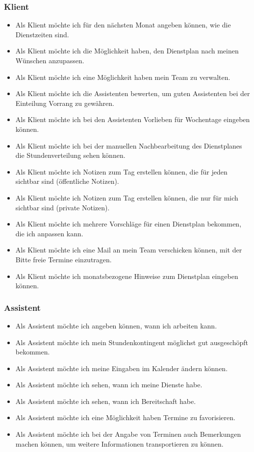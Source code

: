 \documentclass[12pt,a4paper,titlepage]{article} %
\begin{document}
\subsubsection{Klient}
\begin{itemize}
\item Als Klient möchte ich für den nächsten Monat angeben können, wie die Dienstzeiten sind.
\item Als Klient möchte ich die Möglichkeit haben, den Dienstplan nach meinen Wünschen anzupassen.
\item Als Klient möchte ich eine Möglichkeit haben mein Team zu verwalten.
\item Als Klient möchte ich die Assistenten bewerten, um guten Assistenten bei der Einteilung Vorrang zu gewähren.
\item Als Klient möchte ich bei den Assistenten Vorlieben für Wochentage eingeben können.
\item Als Klient möchte ich bei der manuellen Nachbearbeitung des Dienstplanes die Stundenverteilung sehen können.
\item Als Klient möchte ich Notizen zum Tag erstellen können, die für jeden sichtbar sind (öffentliche Notizen).
\item Als Klient möchte ich Notizen zum Tag erstellen können, die nur für mich sichtbar sind (private Notizen).
\item Als Klient möchte ich mehrere Vorschläge für einen Dienstplan bekommen, die ich anpassen kann.
\item Als Klient möchte ich eine Mail an mein Team verschicken können, mit der Bitte freie Termine einzutragen.
\item Als Klient möchte ich monatsbezogene Hinweise zum Dienstplan eingeben können.
\end{itemize}

\subsubsection{Assistent}
\begin{itemize}
\item Als Assistent möchte ich angeben können, wann ich arbeiten kann.
\item Als Assistent möchte ich mein Stundenkontingent möglichst gut ausgeschöpft bekommen.
\item Als Assistent möchte ich meine Eingaben im Kalender ändern können.
\item Als Assistent möchte ich sehen, wann ich meine Dienste habe.
\item Als Assistent möchte ich sehen, wann ich Bereitschaft habe.
\item Als Assistent möchte ich eine Möglichkeit haben Termine zu favorisieren.
\item Als Assistent möchte ich bei der Angabe von Terminen auch Bemerkungen machen können, um weitere Informationen transportieren zu können.
\end{itemize}
\end{document}
